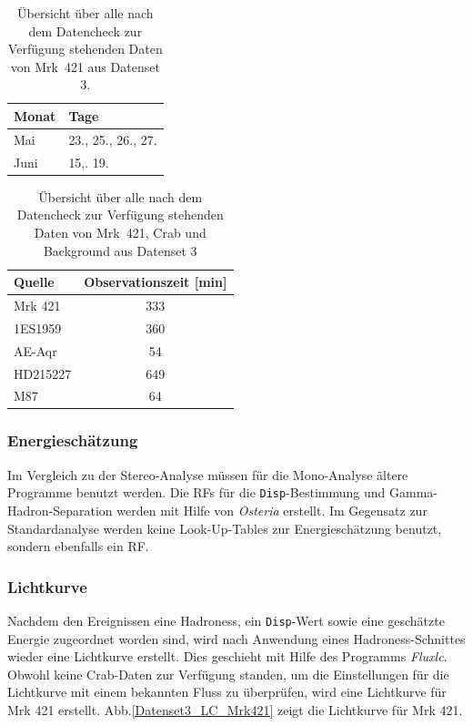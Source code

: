 \begin{table}[!h]
\centering
\caption{Übersicht über alle nach dem Datencheck zur Verfügung stehenden Daten von Mrk~421 aus Datenset 3.}
\label{tab:Datenset3-Mrk421}
\begin{tabular}{ll}
  \toprule
  Monat & Tage\\
  \midrule
  \midrule
Mai & 23., 25., 26., 27.\\
Juni & 15,. 19. \\
  \bottomrule
\end{tabular}
\end{table}


\begin{table}[!h]
\centering
\caption{Übersicht über alle nach dem Datencheck zur Verfügung stehenden Daten von Mrk~421, Crab und Background aus Datenset 3}
\label{tab:Datenset3}
\begin{tabular}{lc}
  \toprule
  Quelle & Observationszeit [min]\\
  \midrule
  \midrule
  Mrk 421 & 333\\
  \midrule
  1ES1959 & 360 \\
  AE-Aqr & 54  \\
  HD215227 & 649 \\
  M87 & 64 \\
  \bottomrule
  \bottomrule
\end{tabular}
\end{table}

\subsubsection{Energieschätzung}
Im Vergleich zu der Stereo-Analyse müssen für die Mono-Analyse ältere Programme benutzt werden.
Die RFs für die \texttt{Disp}-Bestimmung und Gamma-Hadron-Separation werden mit Hilfe von \textit{Osteria} erstellt.
Im Gegensatz zur Standardanalyse werden keine Look-Up-Tables zur Energieschätzung benutzt, sondern ebenfalls ein RF.

\subsubsection{Lichtkurve}
Nachdem den Ereignissen eine Hadroness, ein \texttt{Disp}-Wert sowie eine geschätzte Energie zugeordnet worden sind, wird nach Anwendung eines Hadroness-Schnittes wieder eine Lichtkurve erstellt.
Dies geschieht mit Hilfe des Programms \textit{Fluxlc}.
Obwohl keine Crab-Daten zur Verfügung standen, um die Einstellungen für die Lichtkurve mit einem bekannten Fluss zu überprüfen, wird eine Lichtkurve für Mrk 421 erstellt.
Abb.\ref{Datenset3_LC_Mrk421} zeigt die Lichtkurve für Mrk 421.

